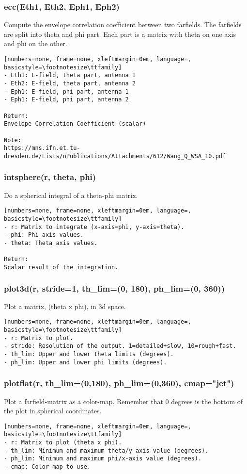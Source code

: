 \subsubsection{ecc(Eth1, Eth2, Eph1, Eph2)}
Compute the envelope correlation coefficient between two farfields. The
farfields are split into theta and phi part. Each part is a matrix with
theta on one axis and phi on the other.

\begin{lstlisting}[numbers=none, frame=none, xleftmargin=0em, language=, basicstyle=\footnotesize\ttfamily]
- Eth1: E-field, theta part, antenna 1
- Eth2: E-field, theta part, antenna 2
- Eph1: E-field, phi part, antenna 1
- Eph1: E-field, phi part, antenna 2

Return:
Envelope Correlation Coefficient (scalar)

Note:
https://mns.ifn.et.tu-dresden.de/Lists/nPublications/Attachments/612/Wang_Q_WSA_10.pdf
\end{lstlisting}

\subsubsection{intsphere(r, theta, phi)}
Do a spherical integral of a theta-phi matrix.

\begin{lstlisting}[numbers=none, frame=none, xleftmargin=0em, language=, basicstyle=\footnotesize\ttfamily]
- r: Matrix to integrate (x-axis=phi, y-axis=theta).
- phi: Phi axis values.
- theta: Theta axis values.

Return:
Scalar result of the integration.
\end{lstlisting}

\subsubsection{plot3d(r, stride=1, th\_lim=(0, 180), ph\_lim=(0, 360))}
Plot a matrix, (theta x phi), in 3d space.

\begin{lstlisting}[numbers=none, frame=none, xleftmargin=0em, language=, basicstyle=\footnotesize\ttfamily]
- r: Matrix to plot.
- stride: Resolution of the output. 1=detailed+slow, 10=rough+fast.
- th_lim: Upper and lower theta limits (degrees).
- ph_lim: Upper and lower phi limits (degrees).
\end{lstlisting}

\subsubsection{plotflat(r, th\_lim=(0,180), ph\_lim=(0,360), cmap="jet")}
Plot a farfield-matrix as a color-map. Remember that 0 degrees is the bottom
of the plot in spherical coordinates.

\begin{lstlisting}[numbers=none, frame=none, xleftmargin=0em, language=, basicstyle=\footnotesize\ttfamily]
- r: Matrix to plot (theta x phi).
- th_lim: Minimum and maximum theta/y-axis value (degrees).
- ph_lim: Minimum and maximum phi/x-axis value (degrees).
- cmap: Color map to use.
\end{lstlisting}

